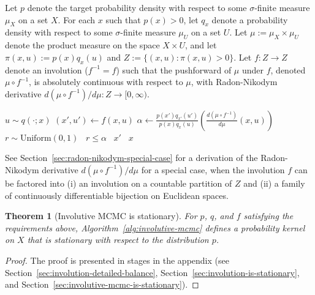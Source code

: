 \documentclass[twoside]{article}
\newtheorem{theorem}{Theorem}[section]
\begin{document}

Let $p$ denote the target probability density with respect to some $\sigma$-finite measure $\mu_X$ on a set $X$.
For each $x$ such that $p(x) > 0$, let $q_x$ denote a probability density with respect to some $\sigma$-finite measure $\mu_U$ on a set $U$.
Let $\mu := \mu_X \times \mu_U$ denote the product measure on the space $X \times U$, and let $\pi(x, u) := p(x) q_x(u)$ and $Z := \{(x, u) : \pi(x, u) > 0\}$.
Let $f : Z \to Z$ denote an involution ($f^{-1} = f$) such that the pushforward of $\mu$ under $f$, denoted $\mu \circ f^{-1}$, is absolutely continuous with respect to $\mu$, with Radon-Nikodym derivative $d (\mu \circ f^{-1}) / d\mu : Z \to [0, \infty)$.

\begin{algorithm}[h]
\begin{algorithmic}
    \State $u \sim q(\cdot; x)$ 
    \State $(x', u') \gets f(x, u)$ 
    \State $\alpha \gets
        \displaystyle \frac{p(x') q_{x'}(u')}{p(x) q_{x}(u)} \left( \frac{d (\mu \circ f^{-1})}{d \mu} (x, u)\right)$
    \State $r \sim \mathrm{Uniform}(0, 1)$
    \State \algorithmicif \, $r \le \alpha$ \algorithmicthen \, \Return $x'$ \algorithmicelse \, \Return $x$ 
\EndProcedure
\end{algorithmic}
\caption{Involutive MCMC}
\label{alg:involutive-mcmc}
\end{algorithm}
See Section~\ref{sec:radon-nikodym-special-case} for a derivation of the Radon-Nikodym derivative $d (\mu \circ f^{-1}) / d \mu$ for a special case, when the involution $f$ can be factored into (i) an involution on a countable partition of $Z$ and (ii) a family of continuously differentiable bijection on Euclidean spaces.

\begin{theorem}[Involutive MCMC is stationary]
For $p$, $q$, and $f$ satisfying the requirements above, Algorithm~\ref{alg:involutive-mcmc} defines a probability kernel on $X$ that is stationary with respect to the distribution $p$.
\end{theorem}
\begin{proof}
The proof is presented in stages in the appendix (see Section~\ref{sec:involution-detailed-balance}, Section~\ref{sec:involution-is-stationary}, and Section~\ref{sec:involutive-mcmc-is-stationary}).
\end{proof}
\end{document}
